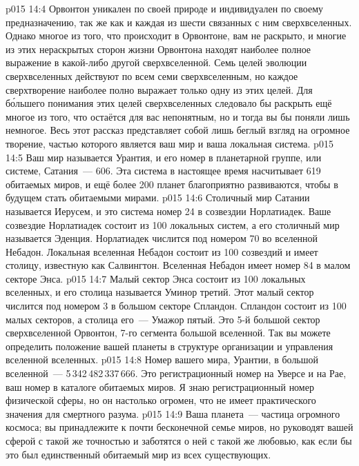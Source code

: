 \vs p015 14:4 Орвонтон уникален по своей природе и индивидуален по своему предназначению, так же как и каждая из шести связанных с ним сверхвселенных. Однако многое из того, что происходит в Орвонтоне, вам не раскрыто, и многие из этих нераскрытых сторон жизни Орвонтона находят наиболее полное выражение в какой\hyp{}либо другой сверхвселенной. Семь целей эволюции сверхвселенных действуют по всем семи сверхвселенным, но каждое сверхтворение наиболее полно выражает только одну из этих целей. Для б\'ольшего понимания этих целей сверхвселенных следовало бы раскрыть ещё многое из того, что остаётся для вас непонятным, но и тогда вы бы поняли лишь немногое. Весь этот рассказ представляет собой лишь беглый взгляд на огромное творение, частью которого является ваш мир и ваша локальная система.
\vs p015 14:5 \pc Ваш мир называется Урантия, и его номер в планетарной группе, или системе, Сатания~--- 606. Эта система в настоящее время насчитывает 619 обитаемых миров, и ещё более 200 планет благоприятно развиваются, чтобы в будущем стать обитаемыми мирами.
\vs p015 14:6 Столичный мир Сатании называется Иерусем, и это система номер 24 в созвездии Норлатиадек. Ваше созвездие Норлатиадек состоит из 100 локальных систем, а его столичный мир называется Эденция. Норлатиадек числится под номером 70 во вселенной Небадон. Локальная вселенная Небадон состоит из 100 созвездий и имеет столицу, известную как Салвингтон. Вселенная Небадон имеет номер 84 в малом секторе Энса.
\vs p015 14:7 Малый сектор Энса состоит из 100 локальных вселенных, и его столица называется Уминор третий. Этот малый сектор числится под номером 3 в большом секторе Спландон. Спландон состоит из 100 малых секторов, а столица его~--- Умажор пятый. Это 5\hyp{}й большой сектор сверхвселенной Орвонтон, 7\hyp{}го сегмента большой вселенной. Так вы можете определить положение вашей планеты в структуре организации и управления вселенной вселенных.
\vs p015 14:8 Номер вашего мира, Урантии, в большой вселенной~--- 5\,342\,482\,337\,666. Это регистрационный номер на Уверсе и на Рае, ваш номер в каталоге обитаемых миров. Я знаю регистрационный номер физической сферы, но он настолько огромен, что не имеет практического значения для смертного разума.
\vs p015 14:9 \pc Ваша планета~--- частица огромного космоса; вы принадлежите к почти бесконечной семье миров, но руководят вашей сферой с такой же точностью и заботятся о ней с такой же любовью, как если бы это был единственный обитаемый мир из всех существующих.
